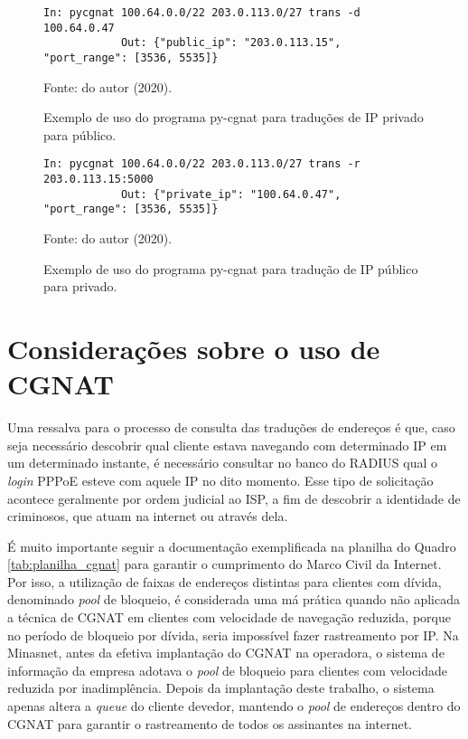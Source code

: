     \begin{figure}[!htb]
        \centering
        \caption{Exemplo de uso do programa py-cgnat para traduções de IP privado para público.} 
        \label{fig:pycgnat_transd}
        
        \begin{Verbatim}[fontsize=\small]
            In: pycgnat 100.64.0.0/22 203.0.113.0/27 trans -d 100.64.0.47
            Out: {"public_ip": "203.0.113.15", "port_range": [3536, 5535]}
        \end{Verbatim} 

        {\small Fonte: do autor (2020).} 
    \end{figure}
    
    \begin{figure}[!htb]
        \centering
        \caption{Exemplo de uso do programa py-cgnat para tradução de IP público para privado.} 
        \label{fig:pycgnat_transr}
        
        \begin{Verbatim}[fontsize=\small]
            In: pycgnat 100.64.0.0/22 203.0.113.0/27 trans -r 203.0.113.15:5000
            Out: {"private_ip": "100.64.0.47", "port_range": [3536, 5535]}
        \end{Verbatim} 

        {\small Fonte: do autor (2020).} 
    \end{figure}

\section{Considerações sobre o uso de CGNAT}
    
    Uma ressalva para o processo de consulta das traduções de endereços é que, caso seja necessário descobrir qual cliente estava navegando com determinado IP em um determinado instante, é necessário consultar no banco do RADIUS qual o \textit{login} PPPoE esteve com aquele IP no dito momento. Esse tipo de solicitação acontece geralmente por ordem judicial ao ISP, a fim de descobrir a identidade de criminosos, que atuam na internet ou através dela.
    
    É muito importante seguir a documentação exemplificada na planilha do Quadro \ref{tab:planilha_cgnat} para garantir o cumprimento do Marco Civil da Internet. Por isso, a utilização de faixas de endereços distintas para clientes com dívida, denominado \textit{pool} de bloqueio, é considerada uma má prática quando não aplicada a técnica de CGNAT em clientes com velocidade de navegação reduzida, porque no período de bloqueio por dívida, seria impossível fazer rastreamento por IP. Na Minasnet, antes da efetiva implantação do CGNAT na operadora, o sistema de informação da empresa adotava o \textit{pool} de bloqueio para clientes com velocidade reduzida por inadimplência. Depois da implantação deste trabalho, o sistema apenas altera a \textit{queue} do cliente devedor, mantendo o \textit{pool} de endereços dentro do CGNAT para garantir o rastreamento de todos os assinantes na internet.

